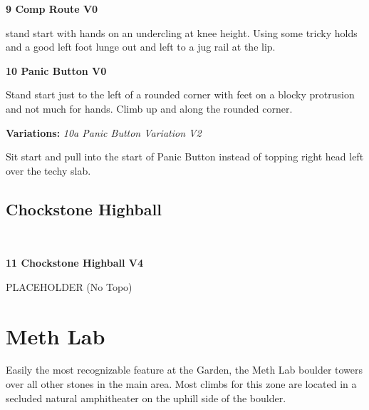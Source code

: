\begin{multicols*}{2}
					\label{rt:Comp Route}\colorbox{green!20}{\textbf{9 Comp Route V0   }}
					\begin{adjustwidth}{0.5cm}{}
					\begin{minipage}{\linewidth}					
					stand start with hands on an undercling at knee height. Using some tricky holds and a good left foot lunge out and left to a jug rail at the lip.
					\end{minipage}
					\end{adjustwidth}
					\label{rt:Panic Button}\colorbox{green!20}{\textbf{10 Panic Button V0   }}
					\begin{adjustwidth}{0.5cm}{}
					\begin{minipage}{\linewidth}					
					Stand start just to the left of a rounded corner with feet on a blocky protrusion and not much for hands. Climb up and along the rounded corner.
					\end{minipage}
						\newline \textbf{Variations:} \newline
							\label{vr:Panic Button Variation}\colorbox{green!20}{\emph{10a Panic Button Variation V2 \ding{72} \ding{72}  }}
							\begin{adjustwidth}{0.5cm}{}
							\begin{minipage}{\linewidth}					
							Sit start and pull into the start of Panic Button instead of topping right head left over the techy slab.
							\end{minipage}
							\end{adjustwidth}
					\end{adjustwidth}
			\subsection*{Chockstone Highball}\label{bf:Chockstone Highball}
			\begin{minipage}{\columnwidth}
			\
			\end{minipage}
			
					\label{rt:Chockstone Highball}\colorbox{RoyalBlue!20}{\textbf{11 Chockstone Highball V4  }}
					\begin{adjustwidth}{0.5cm}{}
					\begin{minipage}{\linewidth}					
					PLACEHOLDER
						\newline (No Topo) 
					\end{minipage}
					\end{adjustwidth}
		\section{Meth Lab}\label{sa:Meth Lab}
	\begin{minipage}{\columnwidth}
	Easily the most recognizable feature at the Garden, the Meth Lab boulder towers over all other stones in the main area. Most climbs for this zone are located in a secluded natural amphitheater on the uphill side of the boulder.
	\end{minipage}

\end{multicols*}

